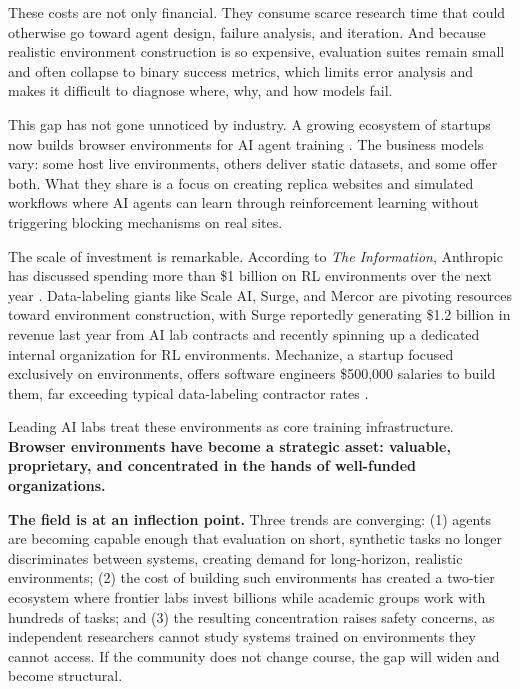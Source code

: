 \documentclass[letterpaper]{article}
\begin{document}
These costs are not only financial. They consume scarce research time that could otherwise go toward agent design, failure analysis, and iteration. And because realistic environment construction is so expensive, evaluation suites remain small and often collapse to binary success metrics, which limits error analysis and makes it difficult to diagnose where, why, and how models fail.

This gap has not gone unnoticed by industry. A growing ecosystem of startups now builds browser environments for AI agent training \citep{mechanize, plato, agiinc, kaizen}. The business models vary: some host live environments, others deliver static datasets, and some offer both. What they share is a focus on creating replica websites and simulated workflows where AI agents can learn through reinforcement learning without triggering blocking mechanisms on real sites.

The scale of investment is remarkable. According to \emph{The Information}, Anthropic has discussed spending more than \$1 billion on RL environments over the next year \citep{zeff2025silicon}. Data-labeling giants like Scale AI, Surge, and Mercor are pivoting resources toward environment construction, with Surge reportedly generating \$1.2 billion in revenue last year from AI lab contracts and recently spinning up a dedicated internal organization for RL environments. Mechanize, a startup focused exclusively on environments, offers software engineers \$500,000 salaries to build them, far exceeding typical data-labeling contractor rates \citep{zeff2025silicon}.

Leading AI labs treat these environments as core training infrastructure. \textbf{Browser environments have become a strategic asset: valuable, proprietary, and concentrated in the hands of well-funded organizations.}

\textbf{The field is at an inflection point.} Three trends are converging: (1) agents are becoming capable enough that evaluation on short, synthetic tasks no longer discriminates between systems, creating demand for long-horizon, realistic environments; (2) the cost of building such environments has created a two-tier ecosystem where frontier labs invest billions while academic groups work with hundreds of tasks; and (3) the resulting concentration raises safety concerns, as independent researchers cannot study systems trained on environments they cannot access. If the community does not change course, the gap will widen and become structural.
\end{document}

